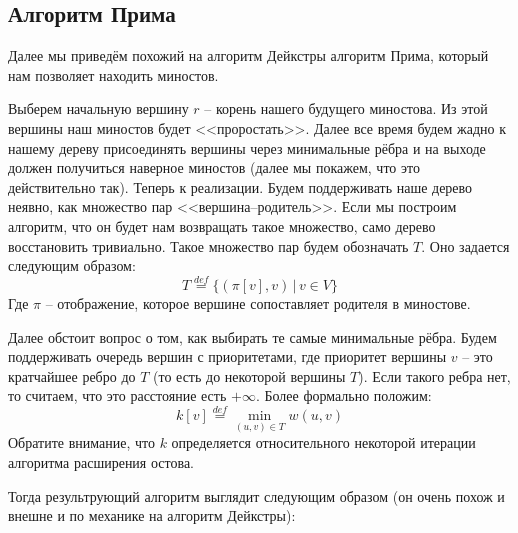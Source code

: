 \subsection{Алгоритм Прима}

Далее мы приведём похожий на алгоритм Дейкстры алгоритм Прима, который нам позволяет находить миностов.

Выберем начальную вершину $r$ -- корень нашего будущего миностова. Из этой вершины наш миностов будет <<проростать>>.
Далее все время будем жадно к нашему дереву присоединять вершины через минимальные рёбра и на выходе должен получиться наверное миностов (далее мы покажем, что это действительно так). Теперь к реализации.
Будем поддерживать наше дерево неявно, как множество пар <<вершина--родитель>>. 
Если мы построим алгоритм, что он будет нам возвращать такое множество, само дерево восстановить тривиально. Такое множество пар будем обозначать $T$.
Оно задается следующим образом:
\begin{equation*}
    T \overset{def}{=} \{ (\pi[v], v) \, | \, v \in V \}
\end{equation*}
Где $\pi$ -- отображение, которое вершине сопоставляет родителя в миностове.

Далее обстоит вопрос о том, как выбирать те самые минимальные рёбра. Будем поддерживать очередь вершин с приоритетами, где приоритет вершины $v$ -- это кратчайшее ребро до $T$ (то есть до некоторой вершины $T$).
Если такого ребра нет, то считаем, что это расстояние есть $+\infty$. Более формально положим:
\begin{equation*}
    k[v] \overset{def}{=} \min\limits_{(u, v) \in T} w(u, v)
\end{equation*}
Обратите внимание, что $k$ определяется относительного некоторой итерации алгоритма расширения остова.

Тогда результрующий алгоритм выглядит следующим образом (он очень похож и внешне и по механике на алгоритм Дейкстры):

